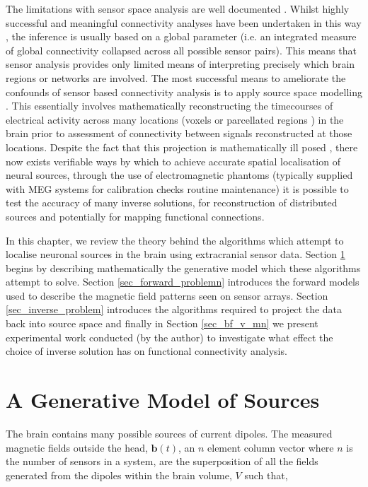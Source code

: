 The limitations with sensor space analysis are well documented \citep{Scoffelen2009}. Whilst highly successful and meaningful connectivity analyses have been undertaken in this way \citep{Stam2004,Bassett2006,Liu2010}, the inference is usually based on a global parameter (i.e. an integrated measure of global connectivity collapsed across all possible sensor pairs). This means that sensor analysis provides only limited means of interpreting precisely which brain regions or networks are involved. The most successful means to ameliorate the confounds of sensor based connectivity analysis is to apply source space modelling \citep{Scoffelen2009}. This essentially involves mathematically reconstructing the timecourses of electrical activity across many locations (voxels \citep{Hipp2012} or parcellated regions \citep{Hillebrand2012,Tewarie2014a}) in the brain prior to assessment of connectivity between signals reconstructed at those locations. Despite the fact that this projection is mathematically ill posed \citep{Hadamard1902}, there now exists verifiable ways by which to achieve accurate spatial localisation of neural sources, through the use of electromagnetic phantoms (typically supplied with MEG systems for calibration checks routine maintenance) it is possible to test the accuracy of many inverse solutions, for reconstruction of distributed sources and potentially for mapping functional connections. 

In this chapter, we review the theory behind the algorithms which attempt to localise neuronal sources in the brain using extracranial sensor data. Section \ref{sec_gen_model} begins by describing mathematically the generative model which these algorithms attempt to solve. Section \ref{sec_forward_problemn} introduces the forward models used to describe the magnetic field patterns seen on sensor arrays. Section \ref{sec_inverse_problem} introduces the algorithms required to project the data back into source space and finally in Section \ref{sec_bf_v_mn} we present experimental work conducted (by the author) to investigate what effect the choice of inverse solution has on functional connectivity analysis. 

\section{A Generative Model of Sources}\label{sec_gen_model}
The brain contains many possible sources of current dipoles. The measured magnetic fields  outside the head, $\mathbf{b}(t)$, an $n$ element column vector where $n$ is the number of sensors in a system, are the superposition of all the fields generated from the dipoles within the brain volume, $V$ such that,

